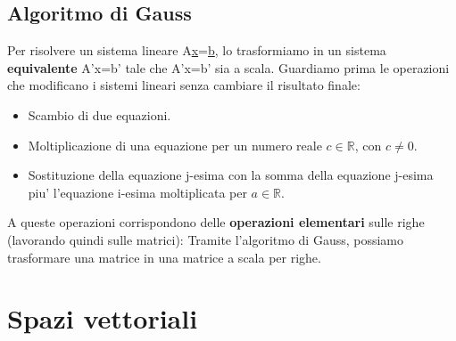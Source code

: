 \documentclass{report}
\begin{document}
\section{Algoritmo di Gauss}
Per risolvere un sistema lineare A\underline{x}=\underline{b}, lo trasformiamo in un sistema \textbf{equivalente} A'x=b' tale che A'x=b' sia a scala. Guardiamo prima le operazioni che modificano i sistemi lineari senza cambiare il risultato finale:
\begin{itemize}
\item Scambio di due equazioni.
  \item Moltiplicazione di una equazione per un numero reale $c\in\mathbb{R}$, con $c\neq0$.
    \item Sostituzione della equazione j-esima con la somma della equazione j-esima piu' l'equazione i-esima moltiplicata per $a\in\mathbb{R}$.
\end{itemize}
A queste operazioni corrispondono delle \textbf{operazioni elementari} sulle righe (lavorando quindi sulle matrici):
Tramite l'algoritmo di Gauss, possiamo trasformare una matrice in una matrice a scala per righe.
\chapter{Spazi vettoriali}
\end{document}
